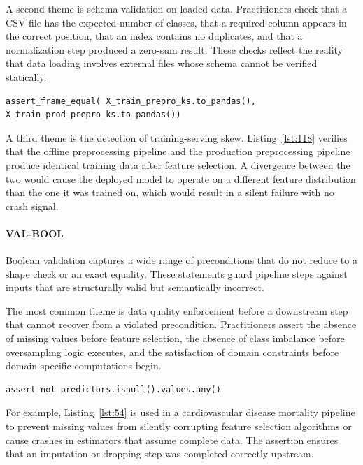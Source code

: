 A second theme is schema validation on loaded data.
Practitioners check that a CSV file has the expected number of classes,
that a required column appears in the correct position,
that an index contains no duplicates,
and that a normalization step produced a zero-sum result.
These checks reflect the reality that data loading involves
external files whose schema cannot be verified statically.

\begin{lstlisting}[caption={}, label={lst:118}]
assert_frame_equal( X_train_prepro_ks.to_pandas(), X_train_prod_prepro_ks.to_pandas())
\end{lstlisting}

A third theme is the detection of training-serving skew.
Listing~\ref{lst:118} verifies
that the offline preprocessing pipeline and the production preprocessing pipeline
produce identical training data after feature selection.
A divergence between the two would cause the deployed model
to operate on a different feature distribution than the one it was trained on,
which would result in a silent failure with no crash signal.

\paragraph{VAL-BOOL}

Boolean validation captures a wide range of preconditions
that do not reduce to a shape check or an exact equality.
These statements guard pipeline steps against inputs
that are structurally valid but semantically incorrect.

The most common theme is data quality enforcement before a downstream step
that cannot recover from a violated precondition.
Practitioners assert the absence of missing values before feature selection,
the absence of class imbalance before oversampling logic executes,
and the satisfaction of domain constraints before domain-specific computations begin.

\begin{lstlisting}[caption={}, label={lst:54}]
assert not predictors.isnull().values.any()
\end{lstlisting}

For example, Listing~\ref{lst:54} is used in a cardiovascular disease mortality pipeline
to prevent missing values
from silently corrupting feature selection algorithms
or cause crashes in estimators that assume complete data.
The assertion ensures that an imputation or dropping step
was completed correctly upstream.


